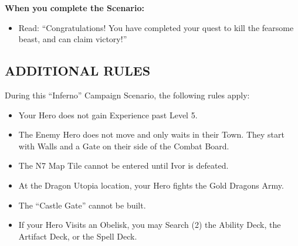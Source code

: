 \begin{multicols*}{2}
\textbf{When you complete the Scenario:}
\begin{itemize}
  \item Read: ``Congratulations! You have completed your quest to kill the fearsome beast, and can claim victory!''
\end{itemize}


\subsection*{\MakeUppercase{Additional Rules}}

During this ``Inferno'' Campaign Scenario, the following rules apply:

\begin{itemize}
    \item Your Hero does not gain Experience past Level 5.
    \item The Enemy Hero does not move and only waits in their Town. They start with Walls and a Gate on their side of the Combat Board.
    \item The N7 Map Tile cannot be entered until Ivor is defeated.
    \item At the Dragon Utopia location, your Hero fights the Gold Dragons Army.
    \item The ``Castle Gate'' cannot be built.
    \item If your Hero Visits an Obelisk, you may Search (2) the Ability Deck, the Artifact Deck, or the Spell Deck.
\end{itemize}

\end{multicols*}

\begin{minipage}{\textwidth}
  \vspace{-2em}
\end{minipage}

